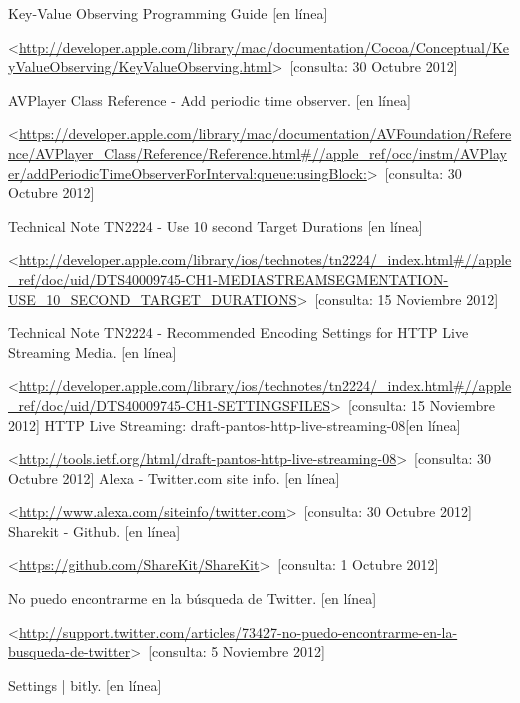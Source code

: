 \begin{thebibliography}{99}
\begin{sloppypar}
Key-Value Observing Programming Guide [en línea]\

\textless \url{http://developer.apple.com/library/mac/documentation/Cocoa/Conceptual/KeyValueObserving/KeyValueObserving.html}\textgreater \ [consulta: 30 Octubre 2012]

%
AVPlayer Class Reference - Add periodic time observer. [en línea]\

\textless \url{https://developer.apple.com/library/mac/documentation/AVFoundation/Reference/AVPlayer_Class/Reference/Reference.html\#//apple_ref/occ/instm/AVPlayer/addPeriodicTimeObserverForInterval:queue:usingBlock:}\textgreater \ [consulta: 30 Octubre 2012]


Technical Note TN2224 - Use 10 second Target Durations [en línea]\

\textless \url{http://developer.apple.com/library/ios/technotes/tn2224/_index.html\#//apple_ref/doc/uid/DTS40009745-CH1-MEDIASTREAMSEGMENTATION-USE_10_SECOND_TARGET_DURATIONS}\textgreater \ [consulta: 15 Noviembre 2012]

Technical Note TN2224 - Recommended Encoding Settings for HTTP Live Streaming Media. [en línea]\

\textless \url{http://developer.apple.com/library/ios/technotes/tn2224/_index.html\#//apple_ref/doc/uid/DTS40009745-CH1-SETTINGSFILES}\textgreater \ [consulta: 15 Noviembre 2012]
HTTP Live Streaming: draft-pantos-http-live-streaming-08[en línea]\

\textless \url{http://tools.ietf.org/html/draft-pantos-http-live-streaming-08}\textgreater \ [consulta: 30 Octubre 2012]
%
Alexa - Twitter.com site info. [en línea]\

\textless \url{http://www.alexa.com/siteinfo/twitter.com}\textgreater \ [consulta: 30 Octubre 2012] 
%
Sharekit - Github. [en línea]\

\textless \url{https://github.com/ShareKit/ShareKit}\textgreater \ [consulta: 1 Octubre 2012] 

%
No puedo encontrarme en la búsqueda de Twitter. [en línea]

\textless \url{http://support.twitter.com/articles/73427-no-puedo-encontrarme-en-la-busqueda-de-twitter}\textgreater \ [consulta: 5 Noviembre 2012] 

%
Settings | bitly. [en línea]\


\end{sloppypar}
\end{thebibliography}
